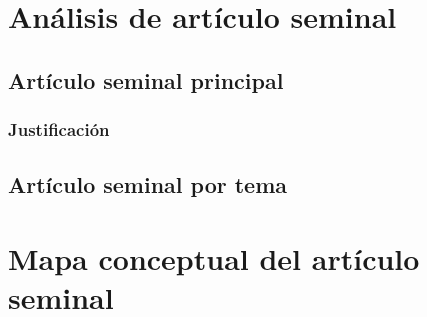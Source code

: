 \clearpage
\section{Análisis de artículo seminal}

\subsection{Artículo seminal principal}

\subsubsection{Justificación}

\subsection{Artículo seminal por tema}

\section{Mapa conceptual del artículo seminal}
